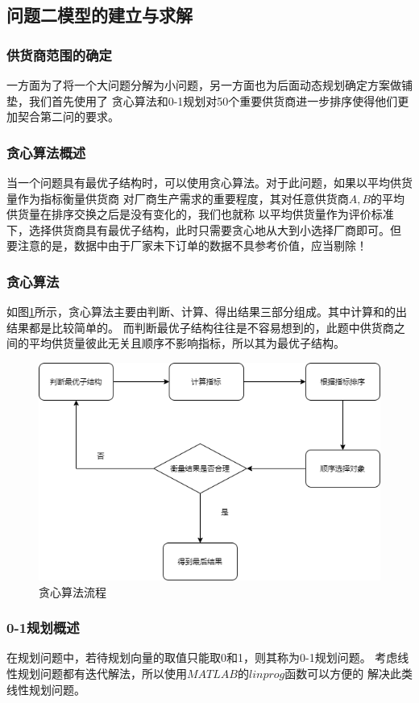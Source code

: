 \documentclass{cumcmthesis}
\begin{document}
\subsection{问题二模型的建立与求解}
\subsubsection{供货商范围的确定}
一方面为了将一个大问题分解为小问题，另一方面也为后面动态规划确定方案做铺垫，我们首先使用了
贪心算法和0-1规划对50个重要供货商进一步排序使得他们更加契合第二问的要求。
\subsubsection*{贪心算法概述}
当一个问题具有最优子结构时，可以使用贪心算法。对于此问题，如果以平均供货量作为指标衡量供货商
对厂商生产需求的重要程度，其对任意供货商$A,B$的平均供货量在排序交换之后是没有变化的，我们也就称
以平均供货量作为评价标准下，选择供货商具有最优子结构，此时只需要贪心地从大到小选择厂商即可。但
要注意的是，数据中由于厂家未下订单的数据不具参考价值，应当剔除！
\subsubsection{贪心算法}
如图\ref{fig:4}所示，贪心算法主要由判断、计算、得出结果三部分组成。其中计算和的出结果都是比较简单的。
而判断最优子结构往往是不容易想到的，此题中供货商之间的平均供货量彼此无关且顺序不影响指标，所以其为最优子结构。
\begin{figure}[H]
    \centering
    \includegraphics[scale = 0.6]{test.png}
    \centering
    \caption{贪心算法流程} \label{fig:4}
\end{figure}
\subsubsection*{0-1规划概述}
在规划问题中，若待规划向量的取值只能取0和1，则其称为0-1规划问题。
考虑线性规划问题都有迭代解法，所以使用$MATLAB$的$linprog$函数可以方便的
解决此类线性规划问题。
\end{document}
